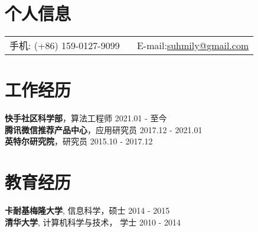 \documentclass[margin,line]{res}
\newenvironment{list2}{
  \begin{list}{$\bullet$}{%
      \setlength{\itemsep}{0in}
      \setlength{\parsep}{0in} \setlength{\parskip}{0in}
      \setlength{\topsep}{0in} \setlength{\partopsep}{0in}
      \setlength{\leftmargin}{0.2in}}}{\end{list}}
\begin{document}
\begin{resume}


	\section{\sc 个人信息}
	\vspace{.05in}
	\begin{tabular}{@{}p{2.6in}p{3in}}
		手机: (+86) 159-0127-9099 \
		 & E-mail:\href{mailto:suhmily@gmail.com}{suhmily\textrm{@}gmail.com} \\
	\end{tabular}



	\section{\sc 工作经历}
	\textbf{快手社区科学部}，算法工程师 \hfill{2021.01 - 至今}\\
	\textbf{腾讯微信推荐产品中心}，应用研究员 \hfill{2017.12 - 2021.01} \\
	\textbf{英特尔研究院}，研究员 \hfill{2015.10 - 2017.12}\\

	\section{\sc 教育经历}
	\textbf{卡耐基梅隆大学}, 信息科学，硕士 \hfill{2014 - 2015} \\
	\textbf{清华大学}, 计算机科学与技术， 学士 \hfill{2010 - 2014}



\end{resume}
\end{document}
